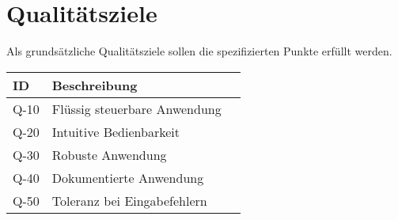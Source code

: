 
\chapter{Qualitätsziele}
Als grundsätzliche Qualitätsziele sollen die spezifizierten Punkte erfüllt werden.

\begin{tabularx}{\textwidth}{|l|X|l|}
\toprule
\textbf{ID} & \textbf{Beschreibung}\\
\endhead
\hline
Q-10 & Flüssig steuerbare Anwendung  \\
Q-20 & Intuitive Bedienbarkeit  \\
Q-30 & Robuste Anwendung  \\
Q-40 & Dokumentierte Anwendung  \\  
Q-50 & Toleranz bei Eingabefehlern \\
\hline
\end{tabularx}
